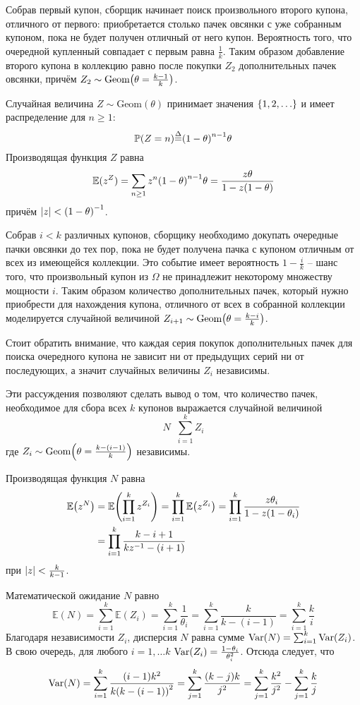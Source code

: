 \documentclass[a4paper]{article}
\let\originalleft\left
\let\originalright\right
\renewcommand{\left}{\mathopen{}\mathclose\bgroup\originalleft}
\renewcommand{\right}{\aftergroup\egroup\originalright}
\newcommand{\obj}[1]{{\left\{ #1 \right \}}}
\newcommand{\brac}[1]{{\left ( #1 \right )}}
\newcommand{\abs}[1]{{\left | #1 \right |}}
\newcommand{\Ex}[0]{{\mathbb{E}}}
\newcommand{\pr}[0]{{\mathbb{P}}}
\newcommand{\Var}[1]{{\text{Var}\brac{#1}}}
\newcommand{\defn}{{\mathop{\overset{\Delta}{=}}\nolimits}}
\begin{document}
Собрав первый купон, сборщик начинает поиск произвольного второго
купона, отличного от первого: приобретается столько пачек овсянки с
уже собранным купоном, пока не будет получен отличный от него купон.
Вероятность того, что очередной купленный совпадает с первым равна
$\frac{1}{k}$. Таким образом добавление второго купона в коллекцию
равно после покупки $Z_2$ дополнительных пачек овсянки, причём
$Z_2\sim \text{Geom}\brac{\theta=\frac{k-1}{k}}$.

Случайная величина $Z\sim\text{Geom}(\theta)$ принимает значения
$\obj{1,2,\ldots}$ и имеет распределение для $n\geq 1$:
\[\pr(Z=n) \defn \brac{1-\theta}^{n-1} \theta\]
Производящая функция $Z$ равна
\[\Ex(z^Z) = \sum_{n\geq1} z^n \brac{1-\theta}^{n-1} \theta
= \frac{z\theta}{1-z(1-\theta)} \]
причём $\abs{z}<\brac{1-\theta}^{-1}$.

Собрав $i<k$ различных купонов, сборщику необходимо докупать
очередные пачки овсянки до тех пор, пока не будет получена пачка с
купоном отличным от всех из имеющейся коллекции.
Это событие имеет вероятность $1-\frac{i}{k}$ -- шанс того, что
произвольный купон из $\Omega$ не принадлежит некоторому множеству
мощности $i$.
Таким образом количество дополнительных пачек, который нужно
приобрести для нахождения купона, отличного от всех в собранной
коллекции моделируется случайной величиной
$Z_{i+1}\sim \text{Geom}\brac{\theta=\frac{k-i}{k}}$.

Стоит обратить внимание, что каждая серия покупок дополнительных
пачек для поиска очередного купона не зависит ни от предыдущих серий
ни от последующих, а значит случайных величины $Z_i$ независимы.

Эти рассуждения позволяют сделать вывод о том, что количество пачек,
необходимое для сбора всех $k$ купонов выражается случайной величиной
\[N\defn \sum_{i=1}^k Z_i\]
где $Z_i\sim \text{Geom}\brac{\theta=\frac{k-(i-1)}{k}}$ независимы.

Производящая функция $N$ равна
\begin{align*}
	\Ex\brac{z^N} &= \Ex\brac{\prod_{i=1}^k z^{Z_i}}
		= \prod_{i=1}^k \Ex\brac{z^{Z_i}}
		= \prod_{i=1}^k \frac{z\theta_i}{1-z(1-\theta_i)} \\
		& = \prod_{i=1}^k \frac{k-i+1}{k z^{-1}-(i+1)}
\end{align*}
при $\abs{z}<\frac{k}{k-1}$.

Математической ожидание $N$ равно
\[\Ex(N) = \sum_{i=1}^k \Ex(Z_i) = \sum_{i=1}^k \frac{1}{\theta_i}
= \sum_{i=1}^k \frac{k}{k-(i-1)} = \sum_{i=1}^k \frac{k}{i} \]
Благодаря независимости $Z_i$, дисперсия $N$ равна сумме $\Var{N} = \sum_{i=1}^k \Var{Z_i}$.
В свою очередь, для любого $i=1,\ldots k$ $\Var{Z_i} = \frac{1-\theta_i}{\theta_i^2}$.
Отсюда следует, что
\[\Var{N} = \sum_{i=1}^k \frac{(i-1) k^2}{k \brac{k-(i-1)}^2} = \sum_{j=1}^k \frac{(k-j) k}{j^2}
= \sum_{j=1}^k \frac{k^2}{j^2} - \sum_{j=1}^k \frac{k}{j}\]
\end{document}
